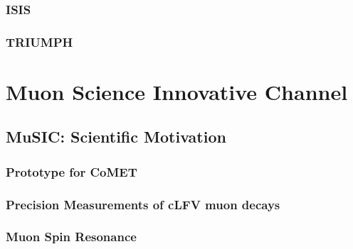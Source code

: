\subsection{ISIS} %
\label{sub:isis}

\subsection{TRIUMPH} %
\label{sub:triumph}

\chapter{Muon Science Innovative Channel} %
\label{cha:music}
\section{MuSIC: Scientific Motivation} %
\label{sec:music_scientific_motivation}
\subsection{Prototype for CoMET} %
\label{sub:prototype_for_comet}

\subsection{Precision Measurements of cLFV muon decays} %
\label{sub:precision_measurements_of_clfv_muon_decays}

\subsection{Muon Spin Resonance} %
\label{sub:muon_spin_resonance}

